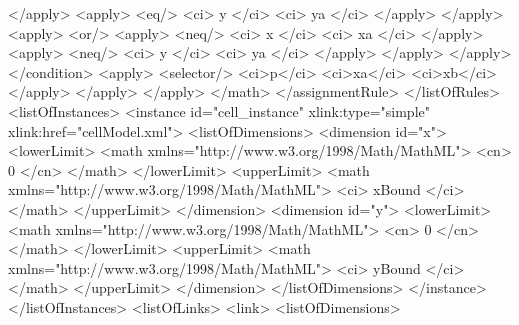 \documentclass{cekarticle}
\begin{document}
\begin{example}
                                    </apply>
                                    <apply>
                                        <eq/>
                                        <ci> y </ci>
                                        <ci> ya </ci>
                                    </apply>
                                </apply>
                                <apply>
                                    <or/>
                                    <apply>
                                        <neq/>
                                        <ci> x </ci>
                                        <ci> xa </ci>
                                    </apply>
                                    <apply>
                                        <neq/>
                                        <ci> y </ci>
                                        <ci> ya </ci>
                                    </apply>
                                </apply>
                            </apply>
                        </condition>
                        <apply>
                            <selector/>
                            <ci>p</ci>
                            <ci>xa</ci>
                            <ci>xb</ci>
                        </apply>
                    </apply>
                </apply>
            </math>
        </assignmentRule>
    </listOfRules>
    <listOfInstances>
        <instance id="cell_instance" xlink:type="simple" xlink:href="cellModel.xml">
            <listOfDimensions>
                <dimension id="x">
                    <lowerLimit>
                        <math xmlns="http://www.w3.org/1998/Math/MathML">
                            <cn> 0 </cn>
                        </math>
                    </lowerLimit>
                    <upperLimit>
                        <math xmlns="http://www.w3.org/1998/Math/MathML">
                            <ci> xBound </ci>
                        </math>
                    </upperLimit>
                </dimension>
                <dimension id="y">
                    <lowerLimit>
                        <math xmlns="http://www.w3.org/1998/Math/MathML">
                            <cn> 0 </cn>
                        </math>
                    </lowerLimit>
                    <upperLimit>
                        <math xmlns="http://www.w3.org/1998/Math/MathML">
                            <ci> yBound </ci>
                        </math>
                    </upperLimit>
                </dimension>
            </listOfDimensions>
        </instance>
    </listOfInstances>
    <listOfLinks>
        <link>
            <listOfDimensions>

\end{example}
\end{document}
